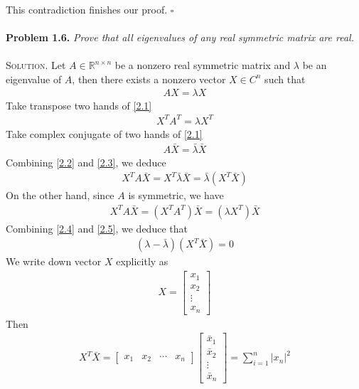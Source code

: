 \documentclass[a4paper,oneside]{book}
\numberwithin{equation}{chapter}
\begin{document}
This contradiction finishes our proof. \hfill $\square$\\
\\
\textbf{Problem 1.6.} \textit{Prove that all eigenvalues of any real symmetric matrix are real.}\\
\\
\textsc{Solution.} Let $A \in {\mathbb{R}^{n \times n}}$ be a nonzero real symmetric matrix and $\lambda$ be an eigenvalue of $A$, then there exists a nonzero vector $X \in {C^n}$ such that 
\begin{align}
\label{2.1}
AX = \lambda X
\end{align}
Take transpose two hands of \eqref{2.1}
\begin{align}
\label{2.2}
{X^T}{A^T} = \lambda {X^T}
\end{align}
Take complex conjugate of two hands of \eqref{2.1}
\begin{align}
\label{2.3}
A\bar X = \bar \lambda \bar X
\end{align}
Combining \eqref{2.2} and \eqref{2.3}, we deduce 
\begin{align}
\label{2.4}
{X^T}A\bar X = {X^T}\bar \lambda \bar X = \bar \lambda \left( {{X^T}\bar X} \right)
\end{align}
On the other hand, since $A$ is symmetric, we have
\begin{align}
\label{2.5}
{X^T}A\bar X = \left( {{X^T}{A^T}} \right)\bar X = \left( {\lambda {X^T}} \right)\bar X
\end{align}
Combining \eqref{2.4} and \eqref{2.5}, we deduce that
\begin{align}
\left( {\lambda  - \bar \lambda } \right)\left( {{X^T}\bar X} \right) = 0
\end{align}
We write down vector $X$ explicitly as
\begin{align}
X = \left[ {\begin{array}{*{20}{c}}
{{x_1}}\\
{{x_2}}\\
 \vdots \\
{{x_n}}
\end{array}} \right]
\end{align}
Then 
\begin{align}
\label{2.6}
{X^T}\bar X = \left[ {\begin{array}{*{20}{c}}
{{x_1}}&{{x_2}}& \cdots &{{x_n}}
\end{array}} \right]\left[ {\begin{array}{*{20}{c}}
{{{\bar x}_1}}\\
{{{\bar x}_2}}\\
 \vdots \\
{{{\bar x}_n}}
\end{array}} \right] = \sum\limits_{i = 1}^n {{{\left| {{x_n}} \right|}^2}} 
\end{align}
\end{document}
